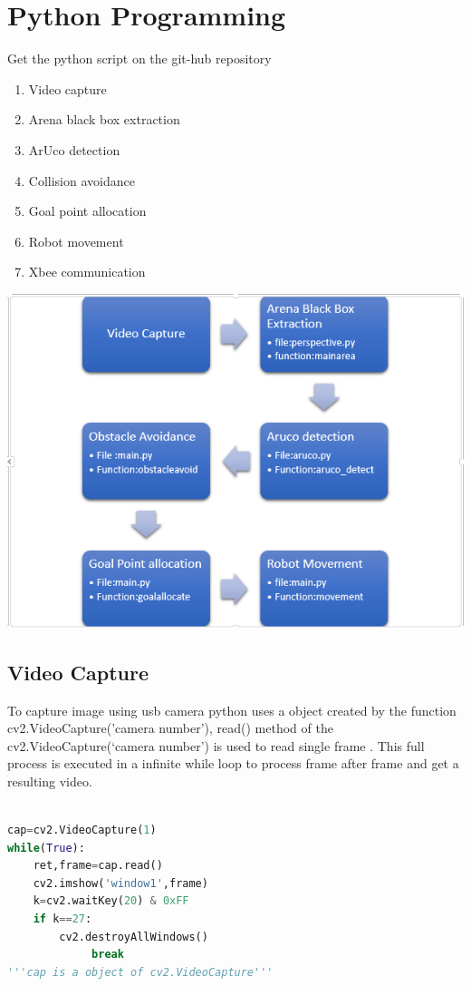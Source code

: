 \documentclass[main.tex]{subfiles}
\begin{document}
\chapter[Python Programming]{Python Programming}

Get the python script on the git-hub repository \href{https://github.com/eYSIP-2017/eYSIP-2017_Formation_Control_of_Multiple_Swarm_Robots}{\ExternalLink}

	\begin{enumerate}
		\item Video capture
		\item Arena black box extraction
		\item ArUco detection
		\item Collision avoidance
		\item Goal point allocation
		\item Robot movement
		\item Xbee communication
	\end{enumerate}	

\includegraphics[scale=.8]{images/flowchart.png}

\pagebreak
\section{Video Capture}
To capture image using usb camera python uses a object created by the function cv2.VideoCapture('camera number'),
read() method of the cv2.VideoCapture(`camera number') is used to read single frame .
This full process is executed in a infinite while loop to process frame after frame and get a resulting video.
\begin{lstlisting}[language=Python, caption = Capturing Video]
		
cap=cv2.VideoCapture(1)
while(True):
	ret,frame=cap.read()
	cv2.imshow('window1',frame)
	k=cv2.waitKey(20) & 0xFF
	if k==27:
		cv2.destroyAllWindows()
       		 break	
'''cap is a object of cv2.VideoCapture'''
\end{lstlisting}
\end{document}

